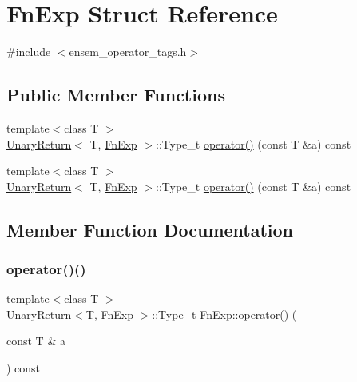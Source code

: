 \hypertarget{structFnExp}{}\section{Fn\+Exp Struct Reference}
\label{structFnExp}


{\ttfamily \#include $<$ensem\+\_\+operator\+\_\+tags.\+h$>$}

\subsection*{Public Member Functions}
\begin{DoxyCompactItemize}
\item 
{\footnotesize template$<$class T $>$ }\\\mbox{\hyperlink{structUnaryReturn}{Unary\+Return}}$<$ T, \mbox{\hyperlink{structFnExp}{Fn\+Exp}} $>$\+::Type\+\_\+t \mbox{\hyperlink{structFnExp_a42b9ce4950a3772fe907b8da3497267e}{operator()}} (const T \&a) const
\item 
{\footnotesize template$<$class T $>$ }\\\mbox{\hyperlink{structUnaryReturn}{Unary\+Return}}$<$ T, \mbox{\hyperlink{structFnExp}{Fn\+Exp}} $>$\+::Type\+\_\+t \mbox{\hyperlink{structFnExp_a42b9ce4950a3772fe907b8da3497267e}{operator()}} (const T \&a) const
\end{DoxyCompactItemize}


\subsection{Member Function Documentation}
\mbox{\label{structFnExp_a42b9ce4950a3772fe907b8da3497267e}} 
\subsubsection{\texorpdfstring{operator()()}{operator()()}\hspace{0.1cm}{\footnotesize\ttfamily [1/2]}}
{\footnotesize\ttfamily template$<$class T $>$ \\
\mbox{\hyperlink{structUnaryReturn}{Unary\+Return}}$<$T, \mbox{\hyperlink{structFnExp}{Fn\+Exp}} $>$\+::Type\+\_\+t Fn\+Exp\+::operator() (\begin{DoxyParamCaption}\item[{const T \&}]{a }\end{DoxyParamCaption}) const\hspace{0.3cm}{\ttfamily [inline]}}

